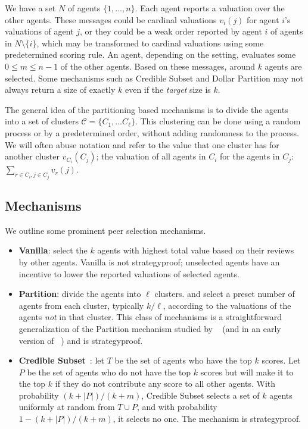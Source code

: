\documentclass[letterpaper]{article}
\newcommand{\clusterset}{\ensuremath{\mathcal{C}}}
\newcommand{\citet}[1]{\citeauthor{#1}~\shortcite{#1}}
\newcommand{\citep}{\cite}
\begin{document}
We have a set $N$ of agents $\{1,\ldots, n\}$. Each agent reports a valuation over the other agents. These messages could be cardinal valuations $v_i(j)$ for agent $i$'s valuations of agent $j$, or they could be a weak order reported by agent $i$ of agents in $N\setminus \{i\}$, which may be transformed to cardinal valuations using some predetermined scoring rule.
An agent, depending on the setting, evaluates some $0 \leq m \leq n-1$ of the other agents.
Based on these messages, around $k$ agents are selected.
Some mechanisms such as Credible Subset and Dollar Partition may not always return a size of exactly $k$ even if the \emph{target} size is $k$.



The general idea of the partitioning based mechanisms is to divide the agents into a set of clusters $\clusterset = \{C_1, \ldots C_{\ell}\}$. This clustering can be done using a random process or by a predetermined order, without adding randomness to the process. We will often abuse notation and refer to the value that one cluster has for another cluster $v_{C_i}(C_j)$; the valuation of all agents in $C_i$ for the agents in $C_j$: $\sum_{r \in C_i, j \in C_j} v_r(j)$.

\subsection{Mechanisms}

We outline some prominent peer selection mechanisms.

\begin{itemize}[leftmargin=*]
	 \setlength\itemsep{0em}


\item \textbf{Vanilla}: %
select the $k$ agents with highest total value based on their reviews by other agents.
Vanilla is not strategyproof; unselected agents have an incentive to lower the reported valuations of selected agents.
\item \textbf{Partition}: divide the agents into ${\ell}$ clusters. and select a preset number of agents from each cluster, typically $k/\ell$, according to the valuations of the agents \emph{not} in that cluster. This class of mechanisms is a straightforward generalization of the Partition mechanism studied by \citet{AFPT11a} (and in an early version of \citet{KLMP15b}) and is strategyproof.
\item \textbf{Credible Subset}~\citep{KLMP15b}:
let $T$ be the set of agents who have the top $k$ scores.
Let $P$ be the set of agents who do not have the top $k$ scores but will make it to the top $k$ if they do not contribute any score to all other agents.
With probability $(k+|P|)/(k+m)$, Credible Subset selects a set of $k$ agents uniformly at random from $T\cup P$, and with probability $1-(k+|P|)/(k+m)$, it selects no one. The mechanism is strategyproof. %



\end{itemize}
\end{document}
